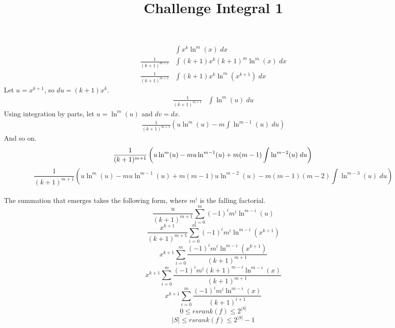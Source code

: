 \documentclass[12pt]{article}
\title{Challenge Integral 1}
\begin{document}
\begin{align*}
                          & \int x^k \ln^m(x) \; dx  \\ 
    \frac{1}{(k+1)^{m+1}} & \int (k+1) x^k (k+1)^m \ln^m (x) \; dx  \\   
    \frac{1}{(k+1)^{m+1}} & \int (k+1) x^k \ln^m(x^{k+1}) \; dx 
\end{align*}
Let $u=x^{k+1}$, so $du=(k+1)x^{k}$.
\begin{align*}
    \frac{1}{(k+1)^{m+1}} & \int \ln^m(u) \; du
\end{align*}
Using integration by parts, let $u=\ln^m(u)$ and $dv=dx$.
\begin{align*}
    \frac{1}{(k+1)^{m+1}} \left( u \ln^m(u) - m \int \ln^{m-1} (u) \; du \right)
\end{align*}
And so on.
\begin{equation*}
    \frac{1}{(k+1)^{m+1}} \left( u \ln^m(u) - m u \ln^{m-1}(u) + m (m-1) \int \ln^{m-2} (u) \; du \right) \\
\end{equation*}
\begin{equation*}
    \frac{1}{(k+1)^{m+1}} \left( u \ln^m(u) - m u \ln^{m-1}(u) + m (m-1) u  \ln^{m-2}(u) - m (m-1) (m-2) \int \ln^{m-3} (u) \; du \right)
\end{equation*}
\\
The summation that emerges takes the following form, where \( m^{\underline{i}} \) is the falling factorial.
\begin{equation*}
    \frac{u}{(k+1)^{m+1}} \sum_{i=0}^m (-1)^i m^{\underline{i}} \ln^{m-i}(u)
\end{equation*}
\begin{equation*}
    \frac{x^{k+1}}{(k+1)^{m+1}} \sum_{i=0}^m (-1)^i m^{\underline{i}} \ln^{m-i}(x^{k+1})
\end{equation*}
\begin{equation*}
    x^{k+1} \sum_{i=0}^m \frac{(-1)^i m^{\underline{i}} \ln^{m-i}(x^{k+1})}{(k+1)^{m+1}}
\end{equation*}
\begin{equation*}
    x^{k+1} \sum_{i=0}^m \frac{(-1)^i m^{\underline{i}} (k+1)^{m-i} \ln^{m-i}(x)}{(k+1)^{m+1}}
\end{equation*}
\begin{equation*}
    x^{k+1} \sum_{i=0}^m \frac{(-1)^i m^{\underline{i}} \ln^{m-i}(x)}{(k+1)^{i+1}}
\end{equation*}
\begin{equation*}
    0 \leq rsrank(f) \leq 2^{|S|}
\end{equation*}
\begin{equation*}
    |S| \leq rsrank(f) \leq 2^{|S|}-1
\end{equation*}
\end{document}
